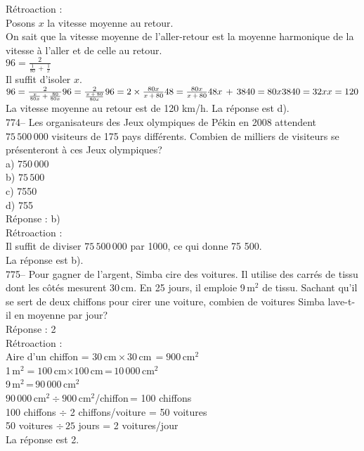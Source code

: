 ﻿\documentclass[letterpaper, 12pt]{article}
\begin{document}
R\'etroaction : \\
Posons $x$ la vitesse moyenne au retour.\\
On sait que la vitesse moyenne de l'aller-retour est la moyenne harmonique
de la vitesse \`a l'aller et de celle au retour.  \\[2mm]
$96=\frac{2}{\frac{1}{80}\,+\,\frac{1}{x}}$\\[2mm]
Il suffit d'isoler $x$.\\[2mm]
$96=\frac{2}{\frac{x}{80x}\,+\,\frac{80}{80x}}\\[2mm]
96=\frac{2}{\frac{x\,+\,80}{80x}}\\[2mm]
96=2\times\frac{80x}{x\,+\,80}\\[2mm]
48=\frac{80x}{x\,+\,80}\\[2mm]
48x\,+\,3840=80x\\[2mm]
3840=32x\\[2mm]
x=120$\\[2mm]
La vitesse moyenne au retour est de 120 km/h.  La r\'eponse est d).\\

774-- Les organisateurs des Jeux olympiques de P\'ekin en 2008 attendent
$75\,500\,000$ visiteurs de 175 pays diff\'erents.  Combien de milliers de
visiteurs se pr\'esenteront \`a ces Jeux olympiques?\\
a) $750\,000$\\
b) $75\,500$\\
c) 7550\\
d) 755\\

R\'eponse : b)\\

R\'etroaction : \\
Il suffit de diviser  $75\,500\,000$ par 1000, ce qui donne 75 500.\\
La r\'eponse est b).\\

775-- Pour gagner de l'argent, Simba cire des voitures.  Il utilise des
carr\'es de tissu dont les c\^ot\'es mesurent 30\,cm.  En 25 jours, il
emploie 9\,m$^{2}$ de tissu.  Sachant qu'il se sert de deux chiffons pour
cirer une voiture, combien de voitures Simba lave-t-il en moyenne par
jour?\\

R\'eponse : 2\\

R\'etroaction : \\
Aire d'un chiffon = $30$\,cm\,$\times\,30$\,cm$\,=900$\,cm$^{2}$\\
1\,m$^{2}=100$\,cm$\times100$\,cm\,=\,$10\,000$\,cm$^{2}$\\
9\,m$^{2}$\,=\,$90\,000$\,cm$^{2}$\\
$90\,000$\,cm$^{2}\div900$\,cm$^{2}$/chiffon\,= 100 chiffons\\
100 chiffons $\div$ 2 chiffons/voiture  = 50 voitures\\
50 voitures $\div \,25 $ jours = 2 voitures/jour\\
La r\'eponse est 2.\\
\end{document}
